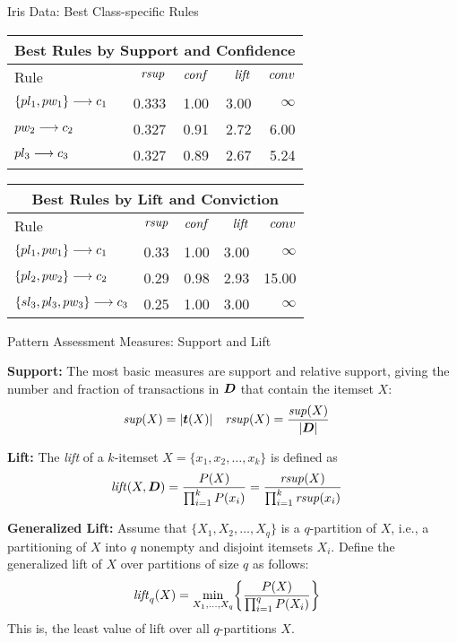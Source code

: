 \begin{frame}{Iris Data: Best Class-specific Rules}
\begin{center}
\begin{tabular}{|l|r|r|r|r|}
  \multicolumn{5}{c}{Best Rules by Support and Confidence}\\
\hline
Rule & $\mathit{rsup}$ & $\mathit{conf}$ & $\mathit{lift}$ & $conv$ \\ \hline \hline
$\{pl_1, pw_1\} \arule c_1$ & 0.333 & 1.00 & 3.00 & $\infty$ \\ \hline
$pw_2 \arule c_2$           & 0.327 & 0.91 & 2.72 & 6.00 \\ \hline
$pl_3 \arule c_3$           & 0.327 & 0.89 & 2.67 & 5.24 \\ \hline
\end{tabular}%
\end{center}
\vspace{0.25in}
\begin{center}
\begin{tabular}{|l|r|r|r|r|}
  \multicolumn{5}{c}{Best Rules by Lift and Conviction}\\
\hline
Rule & $\mathit{rsup}$ & $\mathit{conf}$ & $\mathit{lift}$ & $conv$ \\ \hline \hline
$\{pl_1, pw_1\} \arule c_1$ & 0.33 & 1.00 & 3.00 & $\infty$ \\ \hline
$\{pl_2, pw_2\} \arule c_2$ & 0.29 & 0.98 & 2.93 & 15.00 \\ \hline
$\{sl_3, pl_3, pw_3\} \arule c_3$ & 0.25 & 1.00 & 3.00 & $\infty$ \\ \hline
\end{tabular}%
\end{center}
\end{frame}


\begin{frame}{Pattern Assessment Measures: Support and Lift}

  {\bf Support:} The most basic measures are support and relative
  support, giving the number and fraction of transactions in ${\boldsymbol D}$ that
  contain the itemset $X$:
\begin{align*}
  \mathit{sup}(X) & = |{{\boldsymbol t}}(X)| &
  \mathit{rsup}(X) & = \frac{\mathit{sup}(X)}{|{\boldsymbol D}|}
\end{align*}

\medskip
{\bf Lift:} The {\em lift} of a $k$-itemset
$X=\{x_1,x_2,\ldots,x_k\}$ is def\/{i}ned as
\begin{align*}
  \mathit{lift}(X, {\boldsymbol D}) &= \frac{P(X)}{\prod_{i=1}^k P(x_i)}
  = \frac{\mathit{rsup}(X)}{\prod_{i=1}^k \mathit{rsup}(x_i)}
\end{align*}

\medskip
{\bf Generalized Lift:} 
Assume that
$\{X_1,X_2,\ldots,X_q\}$ is a $q$-partition of $X$, i.e., a
partitioning of $X$ into $q$ nonempty and disjoint itemsets $X_i$.
Def\/{i}ne
the generalized lift of $X$ over partitions of size $q$ as
follows:
\begin{align*}
  \mathit{lift}_q(X)  & = \min_{X_1,\ldots,X_q}
  \biggl\{ \frac{P(X)}{\prod_{i=1}^q P(X_i)} \biggr\}
\end{align*}
This is, the least value of lift over all $q$-partitions
$X$.
\end{frame}


